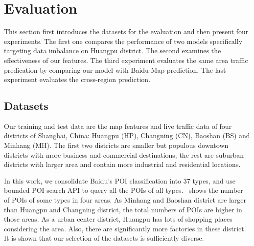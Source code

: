 \section{Evaluation}
This section first introduces the datasets for 
the evaluation and then present four experiments. The first one
compares the performance of two models specifically targeting
data imbalance on Huangpu district. The second examines
the effectiveness of our features. The third experiment evaluates the same area traffic
predication by comparing our model with Baidu Map
prediction. The last experiment
evaluates the cross-region prediction.

\subsection{Datasets}
Our training and test data are the map features and live traffic data 
of four districts of Shanghai, China: Huangpu (HP), Changning (CN), 
Baoshan (BS) and Minhang (MH).
The first two districts are smaller but populous downtown districts 
with more business and commercial
destinations; the rest are suburban districts with larger area and 
contain more industrial and residential locations. 

In this work, we consolidate Baidu's POI classification into 37 types, and use bounded POI search API to query
all the POIs of all types.~ shows the number of POIs of some types in four areas. As Minhang and Baoshan 
district are larger than Huangpu and Changning district, the 
total numbers of POIs are higher in those areas. As a urban center district, 
Huangpu has lots of shopping places considering the area. 
Also, there are significantly more factories 
in these district. It is shown that our selection of the 
datasets is sufficiently diverse.

